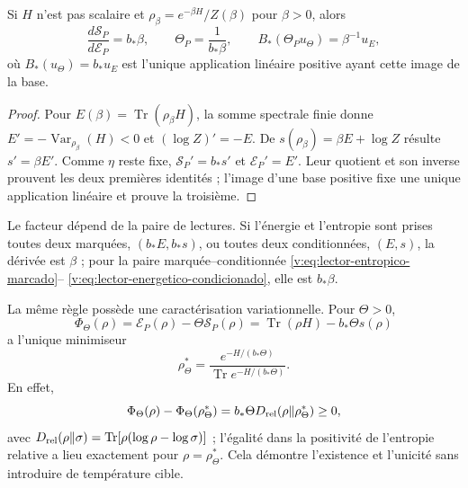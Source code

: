 \begin{theorem}
\label{v:thm:derivada-termometrica-marcada}
Si $H$ n’est pas scalaire et
$\rho_\beta=e^{-\beta H}/Z(\beta)$ pour $\beta>0$, alors
\begin{equation}
 \frac{d\mathcal S_P}{d\mathcal E_P}=b_*\beta,
 \qquad \Theta_P=\frac1{b_*\beta},
 \qquad B_*(\Theta_Pu_\Theta)=\beta^{-1}u_E,
 \label{v:eq:derivada-termometrica-marcada}
\end{equation}
où $B_*(u_\Theta)=b_*u_E$ est l’unique application linéaire positive ayant cette
image de la base.
\end{theorem}
\begin{proof}
Pour $E(\beta)=\operatorname{Tr}(\rho_\beta H)$, la somme spectrale finie
donne $E'=-\operatorname{Var}_{\rho_\beta}(H)<0$ et
$(\log Z)'=-E$. De
$s(\rho_\beta)=\beta E+\log Z$ résulte $s'=\beta E'$. Comme $\eta$
reste fixe,
$\mathcal S_P'=b_*s'$ et $\mathcal E_P'=E'$. Leur quotient et son inverse
prouvent les deux premières identités ; l’image d’une base positive fixe
une unique application linéaire et prouve la troisième.
\end{proof}

Le facteur dépend de la paire de lectures. Si l’énergie et l’entropie sont prises
toutes deux marquées, $(b_*E,b_*s)$, ou toutes deux conditionnées, $(E,s)$, la dérivée
est $\beta$ ; pour la paire marquée--conditionnée
\eqref{v:eq:lector-entropico-marcado}--
\eqref{v:eq:lector-energetico-condicionado}, elle est $b_*\beta$.

La même règle possède une caractérisation variationnelle. Pour $\Theta>0$,
\begin{equation}
 \Phi_\Theta(\rho)=\mathcal E_P(\rho)-\Theta\mathcal S_P(\rho)
 =\operatorname{Tr}(\rho H)-b_*\Theta s(\rho)
 \label{v:eq:funcional-variacional-marcado}
\end{equation}
a l’unique minimiseur
\begin{equation}
 \rho_\Theta^*=\frac{e^{-H/(b_*\Theta)}}
                    {\operatorname{Tr}e^{-H/(b_*\Theta)}}.
 \label{v:eq:minimo-variacional-marcado}
\end{equation}
En effet,
\[
 \Phi_\Theta(\rho)-\Phi_\Theta(\rho_\Theta^*)
 =b_*\Theta D_{\rm rel}(\rho\Vert\rho_\Theta^*)\ge0,
\]
avec
$D_{\rm rel}(\rho\Vert\sigma)
=\operatorname{Tr}[\rho(\log\rho-\log\sigma)]$ ; l’égalité dans la
positivité de l’entropie relative a lieu exactement
pour $\rho=\rho_\Theta^*$. Cela démontre l’existence et l’unicité sans
introduire de température cible.

